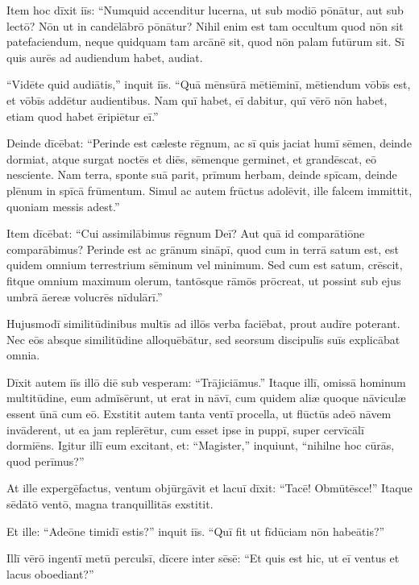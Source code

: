 \Versus Item hoc dīxit iīs: ``Numquid accenditur lucerna, ut sub modiō pōnātur, aut sub lectō? Nōn ut in candēlābrō pōnātur?
\Versus Nihil enim est tam occultum quod nōn sit patefaciendum, neque quidquam tam arcānē sit, quod nōn palam futūrum sit.
\Versus Sī quis aurēs ad audiendum habet, audiat.

\Versus ``Vidēte quid audiātis,'' inquit iīs. ``Quā mēnsūrā mētiēminī, mētiendum vōbīs est, et vōbīs addētur audientibus.
\Versus Nam quī habet, eī dabitur, quī vērō nōn habet, etiam quod habet ēripiētur eī.''

\Versus Deinde dīcēbat: ``Perinde est cæleste rēgnum, ac sī quis jaciat humī sēmen,
\Versus deinde dormiat, atque surgat noctēs et diēs, sēmenque germinet, et grandēscat, eō nesciente.
\Versus Nam terra, sponte suā parit, prīmum herbam, deinde spīcam, deinde plēnum in spīcā frūmentum.
\Versus Simul ac autem frūctus adolēvit, ille falcem immittit, quoniam messis adest.''

\Versus Item dīcēbat: ``Cui assimilābimus rēgnum Deī? Aut quā id comparātiōne comparābimus?
\Versus Perinde est ac grānum sināpī, quod cum in terrā satum est, est quidem omnium terrestrium sēminum vel minimum.
\Versus Sed cum est satum, crēscit, fitque omnium maximum olerum, tantōsque rāmōs prōcreat, ut possint sub ejus umbrā āereæ volucrēs nīdulārī.''

\Versus Hujusmodī similitūdinibus multīs ad illōs verba faciēbat, prout audīre poterant.
\Versus Nec eōs absque similitūdine alloquēbātur, sed seorsum discipulīs suīs explicābat omnia.

\Versus Dīxit autem iīs illō diē sub vesperam: ``Trājiciāmus.''
\Versus Itaque illī, omissā hominum multitūdine, eum admīsērunt, ut erat in nāvī, cum quidem aliæ quoque nāviculæ essent ūnā cum eō.
\Versus Exstitit autem tanta ventī procella, ut flūctūs adeō nāvem invāderent, ut ea jam replērētur,
\Versus cum esset ipse in puppī, super cervīcālī dormiēns. Igitur illī eum excitant, et: ``Magister,'' inquiunt, ``nihilne hoc cūrās, quod perīmus?''

\Versus At ille expergēfactus, ventum objūrgāvit et lacuī dīxit: ``Tacē! Obmūtēsce!'' Itaque sēdātō ventō, magna tranquillitās exstitit.

\Versus Et ille: ``Adeōne timidī estis?'' inquit iīs. ``Quī fit ut fīdūciam nōn habeātis?''

\Versus Illī vērō ingentī metū perculsī, dīcere inter sēsē: ``Et quis est hic, ut eī ventus et lacus oboediant?''
